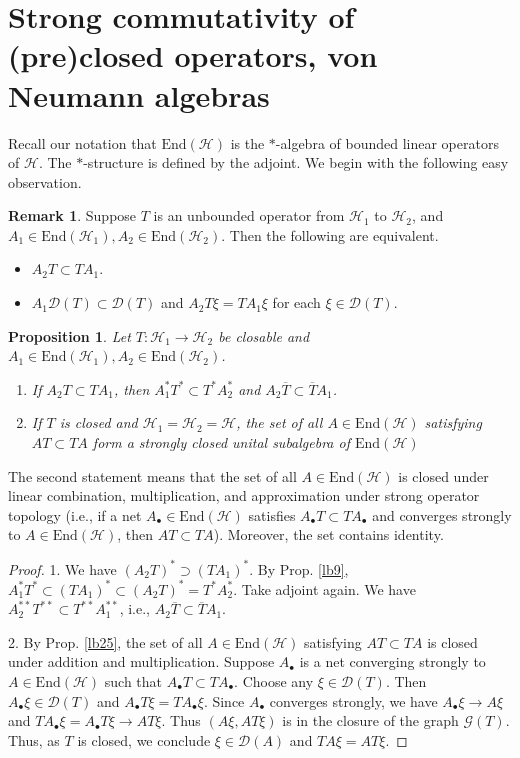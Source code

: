 \documentclass[12pt,b5paper,notitlepage]{article}
\theoremstyle{definition}
\newtheorem{rem}[df]{Remark}
\theoremstyle{plain}
\newtheorem{pp}[df]{Proposition}
\newcommand{\mc}{\mathcal}
\newcommand{\ovl}{\overline}
\newcommand{\End}{\mathrm{End}} %
\newcommand{\Dom}{\scr D}
\newcommand{\scr}{\mathscr}
\newcommand{\blt}{\bullet}
\numberwithin{equation}{section}
\begin{document}
\section{Strong commutativity of (pre)closed operators, von Neumann algebras}\label{lb67}



Recall our notation that $\End(\mc H)$ is the $*$-algebra of bounded linear operators of $\mc H$. The $*$-structure is defined by the adjoint. We begin with the following easy observation.

\begin{rem}
Suppose $T$ is an unbounded operator from $\mc H_1$ to $\mc H_2$, and $A_1\in\End(\mc H_1),A_2\in\End(\mc H_2)$. Then the following are equivalent.
\begin{itemize}
\item $A_2T\subset TA_1$.
\item $A_1\Dom(T)\subset \Dom(T)$ and $A_2T\xi=TA_1\xi$ for each $\xi\in\Dom(T)$. 
\end{itemize}
\end{rem}

\begin{pp}\label{lb26}
Let $T:\mc H_1\rightarrow\mc H_2$ be closable and $A_1\in\End(\mc H_1),A_2\in\End(\mc H_2)$.
\begin{enumerate}
\item If $A_2T\subset TA_1$, then $A_1^*T^*\subset T^*A_2^*$ and $A_2\ovl T\subset \ovl T A_1$.
\item If $T$ is closed and $\mc H_1=\mc H_2=\mc H$, the set of all $A\in\End(\mc H)$ satisfying $AT\subset TA$ form a strongly closed unital subalgebra of $\End(\mc H)$
\end{enumerate}
\end{pp}



The second statement means that the set of all $A\in\End(\mc H)$ is closed under linear combination, multiplication, and approximation under strong operator topology (i.e., if a net $A_\blt\in \End(\mc H)$ satisfies $A_\blt T\subset TA_\blt$ and converges strongly to $A\in\End(\mc H)$, then $AT\subset TA$). Moreover, the set contains identity.

\begin{proof}
1. We have $(A_2T)^*\supset (TA_1)^*$. By Prop. \ref{lb9}, $A_1^*T^*\subset (TA_1)^*\subset (A_2T)^*=T^*A_2^*$. Take adjoint again. We have $A_2^{**}T^{**}\subset T^{**}A_1^{**}$, i.e., $A_2\ovl{T}\subset\ovl{T}A_1$.

2. By Prop. \ref{lb25}, the set of all $A\in\End(\mc H)$ satisfying $AT\subset TA$ is closed under addition and multiplication. Suppose $A_\blt$ is a net converging strongly to $A\in\End(\mc H)$ such that $A_\blt T\subset TA_\blt$. Choose any $\xi\in\Dom(T)$. Then $A_\blt\xi\in\Dom(T)$ and $A_\blt T\xi=TA_\blt\xi$. Since $A_\blt$ converges strongly, we have $A_\blt\xi\rightarrow A\xi$  and $TA_\blt\xi=A_\blt T\xi\rightarrow AT\xi$. Thus $(A\xi,AT\xi)$ is in the closure of the graph $\scr G(T)$. Thus, as $T$ is closed, we conclude $\xi\in\Dom(A)$ and $TA\xi=AT\xi$.
\end{proof}
\end{document}
